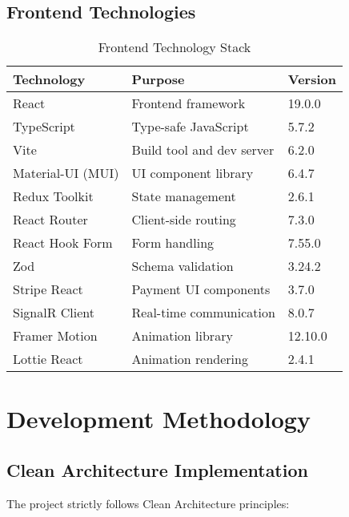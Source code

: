 \documentclass[12pt,a4paper]{article}
\begin{document}
\subsection{Frontend Technologies}

\begin{table}[H]
    \centering
    \begin{tabularx}{\textwidth}{|l|X|l|}
        \hline
        \textbf{Technology} & \textbf{Purpose} & \textbf{Version} \\
        \hline
        React & Frontend framework & 19.0.0 \\
        \hline
        TypeScript & Type-safe JavaScript & 5.7.2 \\
        \hline
        Vite & Build tool and dev server & 6.2.0 \\
        \hline
        Material-UI (MUI) & UI component library & 6.4.7 \\
        \hline
        Redux Toolkit & State management & 2.6.1 \\
        \hline
        React Router & Client-side routing & 7.3.0 \\
        \hline
        React Hook Form & Form handling & 7.55.0 \\
        \hline
        Zod & Schema validation & 3.24.2 \\
        \hline
        Stripe React & Payment UI components & 3.7.0 \\
        \hline
        SignalR Client & Real-time communication & 8.0.7 \\
        \hline
        Framer Motion & Animation library & 12.10.0 \\
        \hline
        Lottie React & Animation rendering & 2.4.1 \\
        \hline
    \end{tabularx}
    \caption{Frontend Technology Stack}
\end{table}

\section{Development Methodology}

\subsection{Clean Architecture Implementation}

The project strictly follows Clean Architecture principles:
\end{document}
